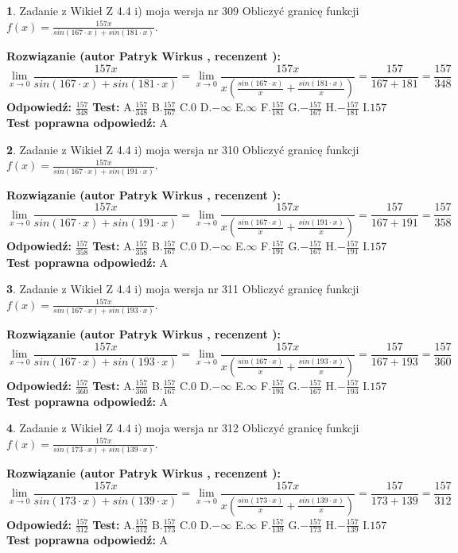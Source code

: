 \documentclass[12pt, a4paper]{article}
\theoremstyle{definition} %
\newtheorem{zad}{}
\newcommand{\zadStart}[1]{\begin{zad}#1\newline}
\newcommand{\zadStop}{\end{zad}}
\newcommand{\rozwStart}[2]{\noindent \textbf{Rozwiązanie (autor #1 , recenzent #2): }\newline}
\newcommand{\rozwStop}{\newline}
\newcommand{\odpStart}{\noindent \textbf{Odpowiedź:}\newline}
\newcommand{\odpStop}{\newline}
\newcommand{\testStart}{\noindent \textbf{Test:}\newline}
\newcommand{\testStop}{\newline}
\newcommand{\kluczStart}{\noindent \textbf{Test poprawna odpowiedź:}\newline}
\newcommand{\kluczStop}{\newline}
\begin{document}
\zadStart{Zadanie z Wikieł Z 4.4 i) moja wersja nr 309}
Obliczyć granicę funkcji $f(x)=\frac{157x}{sin(167\cdot x) +sin(181\cdot x)}$.
\zadStop
\rozwStart{Patryk Wirkus}{}
$$\lim\limits_{x\to 0}\frac{157x}{sin(167\cdot x) +sin(181\cdot x)}=\lim\limits_{x\to 0}\frac{157x}{x(\frac{sin(167\cdot x)}{x}+\frac{sin(181\cdot x)}{x})}=\frac{157}{167+181} = \frac{157}{348}$$
\rozwStop
\odpStart
$\frac{157}{348}$
\odpStop
\testStart
A.$\frac{157}{348}$
B.$\frac{157}{167}$
C.$0$
D.$-\infty$
E.$\infty$
F.$\frac{157}{181}$
G.$-\frac{157}{167}$
H.$-\frac{157}{181}$
I.$157$
\testStop
\kluczStart
A
\kluczStop



\zadStart{Zadanie z Wikieł Z 4.4 i) moja wersja nr 310}
Obliczyć granicę funkcji $f(x)=\frac{157x}{sin(167\cdot x) +sin(191\cdot x)}$.
\zadStop
\rozwStart{Patryk Wirkus}{}
$$\lim\limits_{x\to 0}\frac{157x}{sin(167\cdot x) +sin(191\cdot x)}=\lim\limits_{x\to 0}\frac{157x}{x(\frac{sin(167\cdot x)}{x}+\frac{sin(191\cdot x)}{x})}=\frac{157}{167+191} = \frac{157}{358}$$
\rozwStop
\odpStart
$\frac{157}{358}$
\odpStop
\testStart
A.$\frac{157}{358}$
B.$\frac{157}{167}$
C.$0$
D.$-\infty$
E.$\infty$
F.$\frac{157}{191}$
G.$-\frac{157}{167}$
H.$-\frac{157}{191}$
I.$157$
\testStop
\kluczStart
A
\kluczStop



\zadStart{Zadanie z Wikieł Z 4.4 i) moja wersja nr 311}
Obliczyć granicę funkcji $f(x)=\frac{157x}{sin(167\cdot x) +sin(193\cdot x)}$.
\zadStop
\rozwStart{Patryk Wirkus}{}
$$\lim\limits_{x\to 0}\frac{157x}{sin(167\cdot x) +sin(193\cdot x)}=\lim\limits_{x\to 0}\frac{157x}{x(\frac{sin(167\cdot x)}{x}+\frac{sin(193\cdot x)}{x})}=\frac{157}{167+193} = \frac{157}{360}$$
\rozwStop
\odpStart
$\frac{157}{360}$
\odpStop
\testStart
A.$\frac{157}{360}$
B.$\frac{157}{167}$
C.$0$
D.$-\infty$
E.$\infty$
F.$\frac{157}{193}$
G.$-\frac{157}{167}$
H.$-\frac{157}{193}$
I.$157$
\testStop
\kluczStart
A
\kluczStop



\zadStart{Zadanie z Wikieł Z 4.4 i) moja wersja nr 312}
Obliczyć granicę funkcji $f(x)=\frac{157x}{sin(173\cdot x) +sin(139\cdot x)}$.
\zadStop
\rozwStart{Patryk Wirkus}{}
$$\lim\limits_{x\to 0}\frac{157x}{sin(173\cdot x) +sin(139\cdot x)}=\lim\limits_{x\to 0}\frac{157x}{x(\frac{sin(173\cdot x)}{x}+\frac{sin(139\cdot x)}{x})}=\frac{157}{173+139} = \frac{157}{312}$$
\rozwStop
\odpStart
$\frac{157}{312}$
\odpStop
\testStart
A.$\frac{157}{312}$
B.$\frac{157}{173}$
C.$0$
D.$-\infty$
E.$\infty$
F.$\frac{157}{139}$
G.$-\frac{157}{173}$
H.$-\frac{157}{139}$
I.$157$
\testStop
\kluczStart
A
\kluczStop
\end{document}
